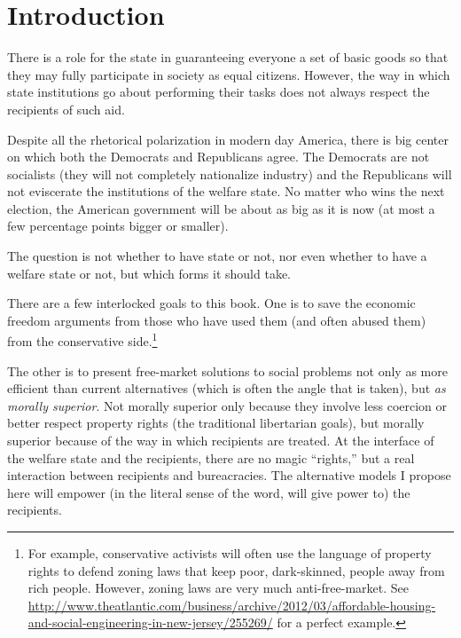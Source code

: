 \chapter{Introduction}

There is a role for the state in guaranteeing everyone a set of basic goods so
that they may fully participate in society as equal citizens. However, the way
in which state institutions go about performing their tasks does not always
respect the recipients of such aid.

Despite all the rhetorical polarization in modern day America, there is big
center on which both the Democrats and Republicans agree. The Democrats are not
socialists (they will not completely nationalize industry) and the Republicans
will not eviscerate the institutions of the welfare state. No matter who wins
the next election, the American government will be about as big as it is now
(at most a few percentage points bigger or smaller).

The question is not whether to have state or not, nor even whether to have a
welfare state or not, but which forms it should take.

There are a few interlocked goals to this book. One is to save the economic
freedom arguments from those who have used them (and often abused them) from
the conservative side.\footnote{For example, conservative activists will often
use the language of property rights to defend zoning laws that keep poor,
dark-skinned, people away from rich people. However, zoning laws are very much
anti-free-market. See
\url{http://www.theatlantic.com/business/archive/2012/03/affordable-housing-and-social-engineering-in-new-jersey/255269/} for a perfect example.} %

The other is to present free-market solutions to social problems not only as
more efficient than current alternatives (which is often the angle that is
taken), but \emph{as morally superior}. Not morally superior only because they
involve less coercion or better respect property rights (the traditional
libertarian goals), but morally superior because of the way in which recipients
are treated. At the interface of the welfare state and the recipients, there
are no magic ``rights,'' but a real interaction between recipients and
bureacracies. The alternative models I propose here will empower (in the
literal sense of the word, will give power to) the recipients.

